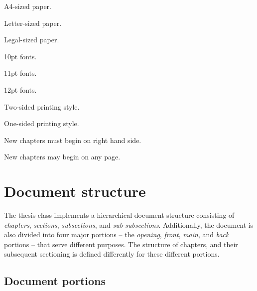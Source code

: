 \documentclass[twoside,openany]{thesis}
\begin{document}
\begin{description}[3cm]

\item[{\ttfamily a4paper}*]     A4-sized paper.

\item[{\ttfamily letterpaper}]  Letter-sized paper.

\item[{\ttfamily legalpaper}]   Legal-sized paper.

\item[{\ttfamily 10pt}*]        10pt fonts.

\item[{\ttfamily 11pt}]         11pt fonts.

\item[{\ttfamily 12pt}]         12pt fonts.

\item[{\ttfamily twoside}]      Two-sided printing style.

\item[{\ttfamily oneside}*]     One-sided printing style.

\item[{\ttfamily openright}*]   New chapters must begin on right hand side.

\item[{\ttfamily openany}]      New chapters may begin on any page.

\end{description}

\chapter{Document structure}\label{ch:Document structure}

The {\ttfamily thesis} class implements a hierarchical document structure consisting of {\itshape chapters}, {\itshape sections}, {\itshape subsections}, and {\itshape sub-subsections}.
Additionally, the document is also divided into four major portions -- the {\itshape opening}, {\itshape front}, {\itshape main}, and {\itshape back} portions -- that serve different purposes.
The structure of chapters, and their subsequent sectioning is defined differently for these different portions.

\section{Document portions}\label{sec:Document portions}
\end{document}
